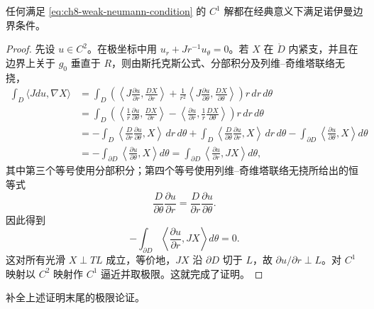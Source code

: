 \begin{lemma}\label{lem:ch8-weak-implies-classical-neumann}
任何满足 \eqref{eq:ch8-weak-neumann-condition} 的 $C^1$ 解都在经典意义下满足诺伊曼边界条件。
\end{lemma}
\begin{proof}
先设 $u\in C^2$。在极坐标中用
$u_r+Jr^{-1}u_\theta=0$。若 $X$ 在 $\mathring D$ 内紧支，并且在边界上关于 $g_0$ 垂直于 $R$，则由斯托克斯公式、分部积分及列维--奇维塔联络无挠，
\begin{align*}
 \int_D\langle Jdu,\nabla X\rangle
 &=\int_D\left(\left\langle J\frac{\partial u}{\partial r},
 \frac{DX}{\partial r}\right\rangle
 +\frac1{r^2}\left\langle J\frac{\partial u}{\partial\theta},
 \frac{DX}{\partial\theta}\right\rangle\right)r\,dr\,d\theta\\
 &=\int_D\left(\left\langle\frac1r\frac{\partial u}{\partial\theta},
 \frac{DX}{\partial r}\right\rangle
 -\left\langle\frac{\partial u}{\partial r},
 \frac1r\frac{DX}{\partial\theta}\right\rangle\right)r\,dr\,d\theta\\
 &=-\int_D\left\langle\frac D{\partial r}\frac{\partial u}{\partial\theta},X\right\rangle\,dr\,d\theta
 +\int_D\left\langle\frac D{\partial\theta}\frac{\partial u}{\partial r},X\right\rangle\,dr\,d\theta
 -\int_{\partial D}\left\langle\frac{\partial u}{\partial\theta},X\right\rangle d\theta\\
 &=-\int_{\partial D}\left\langle\frac{\partial u}{\partial\theta},X\right\rangle d\theta
 =\int_{\partial D}\left\langle\frac{\partial u}{\partial r},JX\right\rangle d\theta,
\end{align*}
其中第三个等号使用分部积分；第四个等号使用列维--奇维塔联络无挠所给出的恒等式
\[
 \frac D{\partial\theta}\frac{\partial u}{\partial r}
 =\frac D{\partial r}\frac{\partial u}{\partial\theta}.
\]
因此得到
\[
 -\int_{\partial D}\left\langle\frac{\partial u}{\partial r},JX\right\rangle d\theta=0.
\]
这对所有光滑 $X\perp TL$ 成立，等价地，$JX$ 沿 $\partial D$ 切于 $L$，故
$\partial u/\partial r\perp L$。对 $C^1$ 映射以 $C^2$ 映射作 $C^1$ 逼近并取极限。这就完成了证明。
\end{proof}
\begin{exercise}\label{ex:ch8-fill-limiting-argument}
补全上述证明末尾的极限论证。
\end{exercise}

